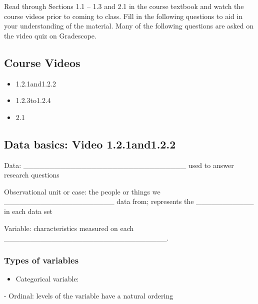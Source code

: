\documentclass[
]{report}
\providecommand{\tightlist}{%
  \setlength{\itemsep}{0pt}\setlength{\parskip}{0pt}}
\newcommand{\rgi}{\hspace{24pt}}  %
\begin{document}

Read through Sections 1.1 -- 1.3 and 2.1 in the course textbook and watch the course videos prior to coming to class. Fill in the following questions to aid in your understanding of the material. Many of the following questions are asked on the video quiz on Gradescope.

\subsection{Course Videos}\label{course-videos}

\begin{itemize}
\item
  1.2.1and1.2.2
\item
  1.2.3to1.2.4
\item
  2.1
\end{itemize}

\subsection*{Data basics: Video 1.2.1and1.2.2}\label{data-basics-video-1.2.1and1.2.2}

Data: \_\_\_\_\_\_\_\_\_\_\_\_\_\_\_\_\_\_\_\_\_\_\_\_\_\_\_\_\_\_\_ used to answer research questions

Observational unit or case: the people or things we \_\_\_\_\_\_\_\_\_\_\_\_\_\_\_\_\_\_\_\_\_ data from; represents the \_\_\_\_\_\_\_\_\_\_\_ in each data set

Variable: characteristics measured on each \_\_\_\_\_\_\_\_\_\_\_\_\_\_\_\_\_\_\_\_\_\_\_\_\_\_\_\_\_\_\_.

\subsubsection*{Types of variables}\label{types-of-variables}

\begin{itemize}
\tightlist
\item
  Categorical variable:
\end{itemize}

\vspace{0.5in}


\rgi - Ordinal: levels of the variable have a natural ordering
\end{document}
